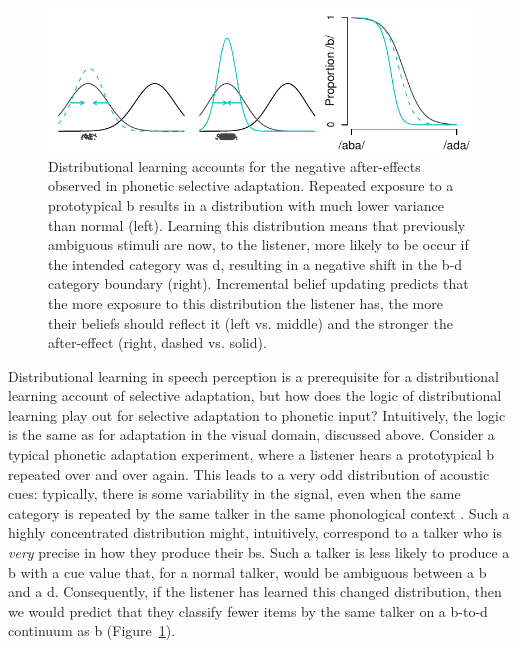 \begin{figure}[ht]\centering
  \includegraphics[width=\textwidth]{schematic-adapt.pdf}
  \caption{Distributional learning accounts for the negative after-effects observed in phonetic selective adaptation.  Repeated exposure to a prototypical \ph b results in a distribution with much lower variance than normal (left).  Learning this distribution means that previously ambiguous stimuli are now, to the listener, more likely to be occur if the intended category was \ph d, resulting in a negative shift in the \ph b-\ph d category boundary (right).  Incremental belief updating predicts that the more exposure to this distribution the listener has, the more their beliefs should reflect it (left vs. middle) and the stronger the after-effect (right, dashed vs. solid).}
  \label{fig:schematic-selad}
\end{figure}

Distributional learning in speech perception is a prerequisite for a distributional learning account of selective adaptation, but how does the logic of distributional learning play out for selective adaptation to phonetic input?  Intuitively, the logic is the same as for adaptation in the visual domain, discussed above.  Consider a typical phonetic adaptation experiment, where a listener hears a prototypical \ph b repeated over and over again.  This leads to a very odd distribution of acoustic cues: typically, there is some variability in the signal, even when the same category is repeated by the same talker in the same phonological context \cite{Allen2003,Newman2001}.  Such a highly concentrated distribution might, intuitively, correspond to a talker who is \emph{very} precise in how they produce their \ph bs.  Such a talker is less likely to produce a \ph b with a cue value that, for a normal talker, would be ambiguous between a \ph b and a \ph d.  Consequently, if the listener has learned this changed distribution, then we would predict that they classify fewer items by the same talker on a \ph b-to-\ph d continuum as \ph b (Figure~\ref{fig:schematic-selad}).

